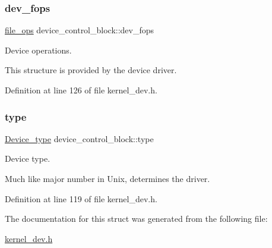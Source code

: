 \subsubsection{\texorpdfstring{dev\+\_\+fops}{dev\_fops}}
{\footnotesize\ttfamily \hyperlink{group__dev_gaab625d8ae3a95e942ed10ed1579f5042}{file\+\_\+ops} device\+\_\+control\+\_\+block\+::dev\+\_\+fops}



Device operations. 

This structure is provided by the device driver. 

Definition at line 126 of file kernel\+\_\+dev.\+h.

\mbox{\label{structdevice__control__block_a35a45268132777177a33513c747633c4}} 
\subsubsection{\texorpdfstring{type}{type}}
{\footnotesize\ttfamily \hyperlink{group__dev_ga879ceac20e83b2375e5b49f4379b0c90}{Device\+\_\+type} device\+\_\+control\+\_\+block\+::type}



Device type. 

Much like \textquotesingle{}major number\textquotesingle{} in Unix, determines the driver. 

Definition at line 119 of file kernel\+\_\+dev.\+h.



The documentation for this struct was generated from the following file\+:\begin{DoxyCompactItemize}
\item 
\hyperlink{kernel__dev_8h}{kernel\+\_\+dev.\+h}\end{DoxyCompactItemize}
